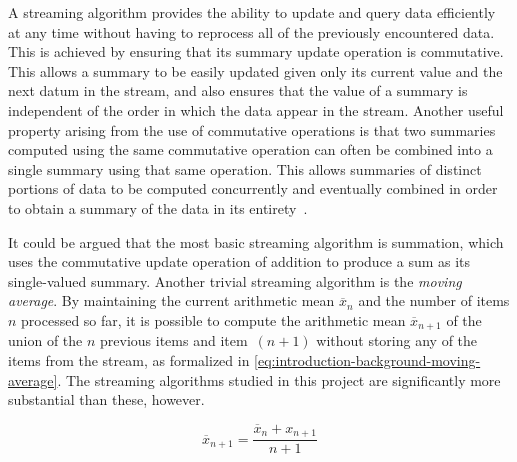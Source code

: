 A streaming algorithm provides the ability to update and query data efficiently at any time without having to reprocess all of the previously encountered data.
This is achieved by ensuring that its summary update operation is commutative.
This allows a summary to be easily updated given only its current value and the next datum in the stream, and also ensures that the value of a summary is independent of the order in which the data appear in the stream.
Another useful property arising from the use of commutative operations is that two summaries computed using the same commutative operation can often be combined into a single summary using that same operation.
This allows summaries of distinct portions of data to be computed concurrently and eventually combined in order to obtain a summary of the data in its entirety~\citep{cormode20}.

It could be argued that the most basic streaming algorithm is summation, which uses the commutative update operation of addition to produce a sum as its single-valued summary.
Another trivial streaming algorithm is the \emph{moving average}.
By maintaining the current arithmetic mean \( \overline{x}_{n} \) and the number of items \( n \) processed so far, it is possible to compute the arithmetic mean \( \overline{x}_{n + 1} \) of the union of the \( n \) previous items and item~\( (n + 1) \) without storing any of the items from the stream, as formalized in \cref{eq:introduction-background-moving-average}.
The streaming algorithms studied in this project are significantly more substantial than these, however.

\begin{equation}
  \label{eq:introduction-background-moving-average}
  \overline{x}_{n + 1} = \frac{\overline{x}_{n} + x_{n + 1}}{n + 1}
\end{equation}
